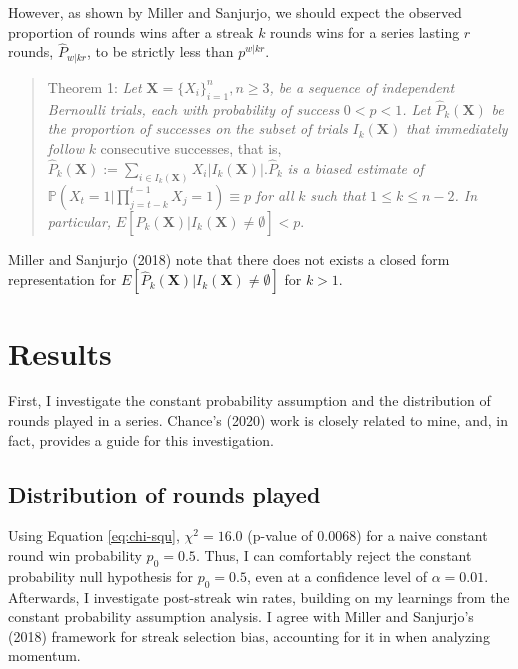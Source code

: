\documentclass{article}
\begin{document}
However, as shown by Miller and Sanjurjo, we should expect the observed
proportion of rounds wins after a streak \(k\) rounds wins for a series
lasting \(r\) rounds, \(\hat{P}_{w|kr}\), to be strictly less than
\(p^{w|kr}\).

\begin{quote}
Theorem 1: \emph{Let}
\(\mathbf{X} = \{X_i\}^{n}_{i=1}, n \geq 3\)\emph{, be a sequence of
independent Bernoulli trials, each with probability of success}
\(0 < p < 1\)\emph{. Let} \(\hat{P}_k(\mathbf{X})\) \emph{be the
proportion of successes on the subset of trials} \(I_k(\mathbf{X})\)
\emph{that immediately follow} \(k\) consecutive successes, that is,
\(\hat{P}_k(\mathbf{X}) := \sum_{i \in I_k(\mathbf{X})} X_i | I_k(\mathbf{X}) |. \hat{P}_k\)
\emph{is a biased estimate of}
\(\mathbb{P}(X_t = 1 | \prod_{j=t-k}^{t-1} X_j = 1) \equiv p\) \emph{for
all} \(k\) \emph{such that} \(1 \leq k \leq n - 2\)\emph{. In
particular,}
\(E[\hat{P}_k(\mathbf{X}) | I_k(\mathbf{X}) \neq \emptyset] < p.\)
\end{quote}

Miller and Sanjurjo (2018) note that there does not exists a closed form
representation for
\(E[\hat{P}_k(\mathbf{X}) | I_k(\mathbf{X}) \neq \emptyset]\) for
\(k > 1\).

\hypertarget{results}{%
\section{Results}\label{results}}

First, I investigate the constant probability assumption and the
distribution of rounds played in a series. Chance's (2020) work is
closely related to mine, and, in fact, provides a guide for this
investigation.

\hypertarget{sec:results-rounds-played}{%
\subsection{Distribution of rounds
played}\label{sec:results-rounds-played}}

Using Equation \ref{eq:chi-squ}, \(\chi^2 = 16.0\) (p-value of 0.0068)
for a naive constant round win probability \(p_0 = 0.5\). Thus, I can
comfortably reject the constant probability null hypothesis for
\(p_0 = 0.5\), even at a confidence level of \(\alpha = 0.01\).
Afterwards, I investigate post-streak win rates, building on my
learnings from the constant probability assumption analysis. I agree
with Miller and Sanjurjo's (2018) framework for streak selection bias,
accounting for it in when analyzing momentum.
\end{document}
